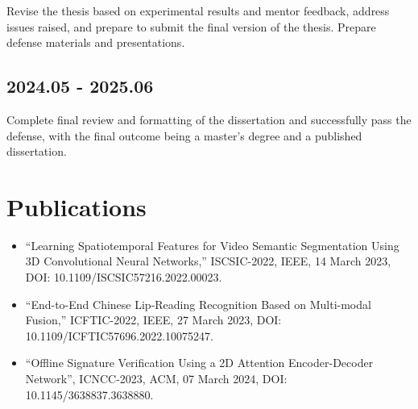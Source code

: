 \documentclass{article}
\begin{document}
Revise the thesis based on experimental results and mentor feedback, address issues raised, and prepare to submit the final version of the thesis. Prepare defense materials and presentations.

\subsection*{2024.05 - 2025.06}

Complete final review and formatting of the dissertation and successfully pass the defense, with the final outcome being a master's degree and a published dissertation.

\newpage
\section{Publications}

\begin{itemize}
	\item ``Learning Spatiotemporal Features for Video Semantic Segmentation Using 3D Convolutional Neural Networks,''
	      ISCSIC-2022, IEEE, 14 March 2023, DOI: 10.1109/ISCSIC57216.2022.00023.
	\item ``End-to-End Chinese Lip-Reading Recognition Based on Multi-modal Fusion,'' ICFTIC-2022, IEEE, 27 March 2023, DOI: 10.1109/ICFTIC57696.2022.10075247.
	\item ``Offline Signature Verification Using a 2D Attention Encoder-Decoder Network'', ICNCC-2023, ACM, 07 March 2024, DOI: 10.1145/3638837.3638880.
\end{itemize}



\newpage
{}
\end{document}
